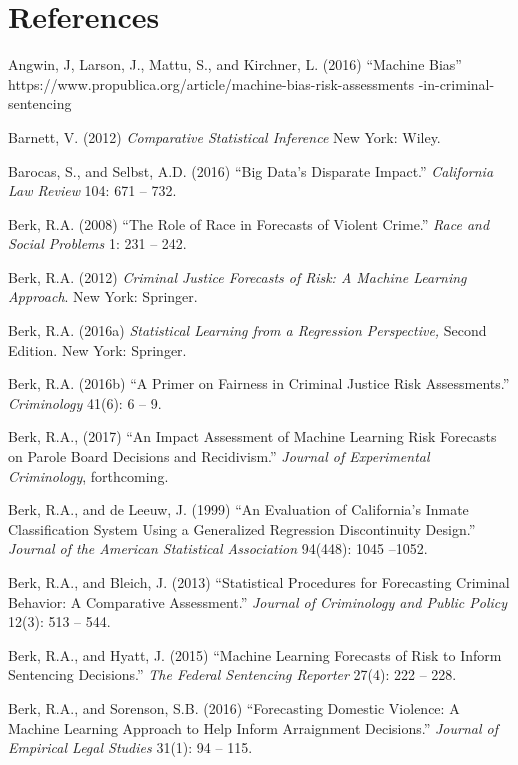 \documentclass[12pt]{article}
\begin{document}
\section*{References}
\begin{description}
\item
Angwin, J, Larson, J., Mattu, S., and Kirchner, L. (2016) ``Machine Bias'' https://www.propublica.org/article/machine-bias-risk-assessments \linebreak-in-criminal-sentencing
\item
Barnett, V. (2012) \textit{Comparative Statistical Inference} New York: Wiley.
\item
Barocas, S., and Selbst, A.D. (2016) ``Big Data's Disparate Impact.'' \textit{California Law Review} 104: 671 -- 732.
\item
Berk, R.A. (2008) ``The Role of Race in Forecasts of Violent Crime.'' \textit{Race and Social Problems} 1: 231 -- 242.
\item
Berk, R.A. (2012) \textit{Criminal Justice Forecasts of Risk: A Machine Learning Approach}. New York: Springer.
\item
Berk, R.A. (2016a) \textit{Statistical Learning from a Regression Perspective,} Second Edition. New York: Springer.
\item
Berk, R.A. (2016b) ``A Primer on Fairness in Criminal Justice Risk Assessments.'' \textit{Criminology} 41(6): 6 -- 9.
\item
Berk, R.A., (2017) ``An Impact Assessment of Machine Learning Risk Forecasts on Parole Board Decisions and Recidivism.'' \textit{Journal of Experimental Criminology}, forthcoming.
\item
Berk, R.A., and de Leeuw, J. (1999) ``An Evaluation of California's Inmate Classification System Using a Generalized Regression Discontinuity Design.'' \textit{Journal of the American Statistical Association} 94(448): 1045 --1052.
\item
Berk, R.A.,  and Bleich, J. (2013) ``Statistical Procedures for Forecasting Criminal Behavior: A Comparative Assessment.'' \textit{Journal of Criminology and Public Policy} 12(3): 513 -- 544.
\item
Berk, R.A., and Hyatt, J. (2015) ``Machine Learning Forecasts of Risk to Inform Sentencing Decisions.'' \textit{The Federal Sentencing Reporter} 27(4): 222 -- 228.
\item
Berk, R.A., and Sorenson, S.B. (2016) ``Forecasting Domestic Violence: A Machine Learning Approach to Help Inform Arraignment Decisions.'' \textit{Journal of Empirical Legal Studies} 31(1): 94 -- 115.

\end{description}
\end{document}

